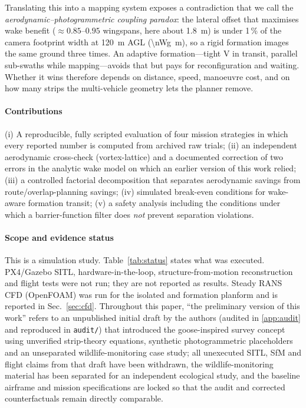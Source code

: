 \documentclass[preprint,12pt]{elsarticle}
\begin{document}
Translating this into a mapping system exposes a contradiction that we call the \emph{aerodynamic--photogrammetric coupling paradox}: the lateral offset that maximises wake benefit ($\approx0.85$--$0.95$ wingspans, here about \SI{1.8}{m}) is under 1\,\% of the camera footprint width at \SI{120}{m} AGL (\SI{\nWg}{m}), so a rigid formation images the same ground three times. An adaptive formation---tight V in transit, parallel sub-swaths while mapping---avoids that but pays for reconfiguration and waiting. Whether it wins therefore depends on distance, speed, manoeuvre cost, and on how many strips the multi-vehicle geometry lets the planner remove.

\paragraph{Contributions} (i) A reproducible, fully scripted evaluation of four mission strategies in which every reported number is computed from archived raw trials; (ii) an independent aerodynamic cross-check (vortex-lattice) and a documented correction of two errors in the analytic wake model on which an earlier version of this work relied; (iii) a controlled factorial decomposition that separates aerodynamic savings from route/overlap-planning savings; (iv) simulated break-even conditions for wake-aware formation transit; (v) a safety analysis including the conditions under which a barrier-function filter does \emph{not} prevent separation violations.

\paragraph{Scope and evidence status} This is a simulation study. Table~\ref{tab:status} states what was executed. PX4/Gazebo SITL, hardware-in-the-loop, structure-from-motion reconstruction and flight tests were not run; they are not reported as results. Steady RANS CFD (OpenFOAM) was run for the isolated and formation planform and is reported in Sec.~\ref{sec:cfd}. Throughout this paper, ``the preliminary version of this work'' refers to an unpublished initial draft by the authors (audited in \ref{app:audit} and reproduced in \texttt{audit/}) that introduced the goose-inspired survey concept using unverified strip-theory equations, synthetic photogrammetric placeholders and an unseparated wildlife-monitoring case study; all unexecuted SITL, SfM and flight claims from that draft have been withdrawn, the wildlife-monitoring material has been separated for an independent ecological study, and the baseline airframe and mission specifications are locked so that the audit and corrected counterfactuals remain directly comparable.
\end{document}
